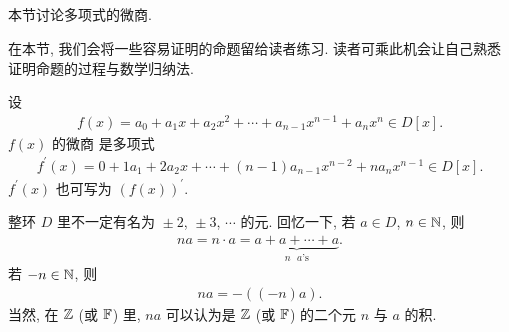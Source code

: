 \subsection*{\Derivatives}
\markright{\Derivatives}

本节讨论多项式的微商.

在本节, 我们会将一些容易证明的命题留给读者练习. 读者可乘此机会让自己熟悉证明命题的过程与数学归纳法.

\begin{definition}
    设
    \begin{align*}
        f(x) = a_0 + a_1 x + a_2 x^2 + \cdots + a_{n-1} x^{n-1} + a_n x^n \in D[x].
    \end{align*}
    $f(x)$ 的微商  是多项式
    \begin{align*}
        f^{\prime}(x) = 0 + 1a_1 + 2a_2 x + \cdots + (n-1)a_{n-1} x^{n-2} + na_n x^{n-1} \in D[x].
    \end{align*}
    $f^{\prime} (x)$ 也可写为 $(f(x))^{\prime}$.
\end{definition}

\begin{remark}
    整环 $D$ 里不一定有名为 ${} \pm 2$, ${}\pm 3$, $\cdots$ 的元. 回忆一下, 若 $a \in D$, $n \in \mathbb{N}$, 则
    \begin{align*}
        na = n \cdot a = \underbrace{a + a + \cdots + a}_{\text{$n$ $a$'s}}.
    \end{align*}
    若 $-n \in \mathbb{N}$, 则
    \begin{align*}
        na = -((-n)a).
    \end{align*}
    当然, 在 $\mathbb{Z}$ (或 $\mathbb{F}$) 里, $na$ 可以认为是 $\mathbb{Z}$ (或 $\mathbb{F}$) 的二个元 $n$ 与 $a$ 的积.
\end{remark}

